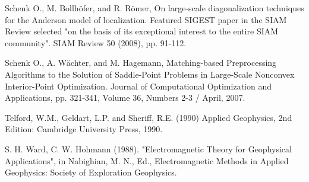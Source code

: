 \documentclass[twoside]{article}
\begin{document}
\begin{thebibliography}{99}
Schenk O., M. Bollhöfer, and R. Römer,
\newblock On large-scale diagonalization techniques for the Anderson model of localization.
\newblock Featured SIGEST paper in the SIAM Review selected "on the basis of its exceptional interest to the entire SIAM community". SIAM Review 50 (2008), pp. 91-112.

Schenk O., A. Wächter, and M. Hagemann,
\newblock Matching-based Preprocessing Algorithms to the Solution of Saddle-Point Problems in Large-Scale Nonconvex Interior-Point Optimization.
\newblock Journal of Computational Optimization and Applications, pp. 321-341, Volume 36, Numbers 2-3 / April, 2007.

Telford, W.M., Geldart, L.P. and Sheriff, R.E. (1990)
\newblock Applied Geophysics, 2nd Edition: Cambridge University Press, 1990.

S. H. Ward, C. W. Hohmann (1988).
\newblock "Electromagnetic Theory for Geophysical Applications", in Nabighian, M. N., Ed., Electromagnetic Methods in Applied Geophysics: Society of Exploration Geophysics.





\end{thebibliography}


\end{document}
